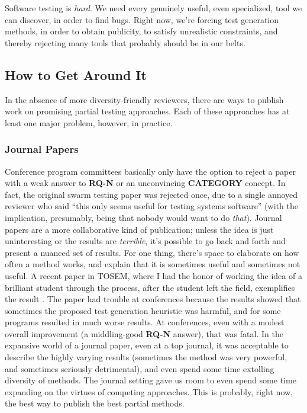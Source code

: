 \documentclass[sigplan]{acmart}
\begin{document}
Software testing is \emph{hard}.  We need every genuinely useful, even
specialized, tool we can discover, in order to find bugs.  Right now,
we're forcing test generation methods, in order to obtain publicity,
to satisfy unrealistic constraints, and thereby rejecting many tools
that probably should be in our belts.

\subsection{How to Get Around It}

In the absence of more diversity-friendly reviewers, there are ways to
publish work on promising partial testing approaches.  Each of these
approaches has at least one major problem, however, in practice.

\subsubsection{Journal Papers}

Conference program committees basically only have the option to reject
a paper with a weak answer to {\bf RQ-N} or an unconvincing {\bf
  CATEGORY} concept.  In fact, the original swarm testing paper was
rejected once, due to a single annoyed reviewer who said ``this only seems useful for
testing systems software'' (with the implication, presumably, being
that nobody would want to do \emph{that}).  Journal papers are a more
collaborative kind of publication; unless the idea is just
uninteresting or the results are \emph{terrible}, it's possible to go
back and forth and present a nuanced set of results.  For one thing,
there's space to elaborate on how often a method works, and explain
that it is sometimes useful and sometimes not useful.  A recent paper
in TOSEM, where I had the honor of working the idea of a brilliant
student through the process, after the student left the field,
exemplifies the result \cite{HolmesLOC}.  The paper had trouble at
conferences because the results showed that sometimes the proposed
test generation heuristic was harmful, and for some programs resulted
in much worse results.  At conferences, even with a modest overall
improvement (a middling-good {\bf RQ-N} answer), that was fatal.  In
the expansive world of a journal paper, even at a top journal, it was
acceptable to describe the highly varying results (sometimes the
method was very powerful, and sometimes seriously detrimental), and
even spend some time extolling diversity of methods.  The journal
setting gave us room to even spend some time expanding on the virtues
of competing approaches.  This is probably, right now, the best way to
publish the best partial methods.
\end{document}
